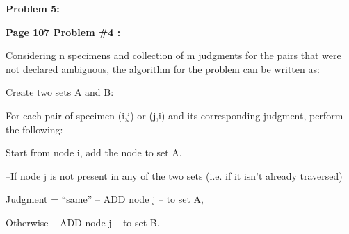 \documentclass[letterpaper,portrait,12pt]{article}
\begin{document}
\begin{flushleft}

\end{flushleft}


\begin{flushleft}

\end{flushleft}


\begin{flushleft}
\textbf{Problem 5:}
\end{flushleft}


\begin{flushleft}
\textbf{Page 107 Problem \#4 :}
\end{flushleft}


\begin{flushleft}
	Considering n specimens and collection of m judgments for the pairs that were not declared ambiguous, the algorithm for the problem can be written as:
\end{flushleft}


\begin{flushleft}

\end{flushleft}


\begin{flushleft}
Create two sets A and B:
\end{flushleft}


\begin{flushleft}
For each pair of specimen (i,j) or (j,i) and its corresponding judgment, perform the following:
\end{flushleft}


\begin{flushleft}
Start from node i, add the node to set A.
\end{flushleft}


\begin{flushleft}

\end{flushleft}


\begin{flushleft}
	--If node j is not present in any of the two sets (i.e. if it isn't already traversed)
\end{flushleft}


\begin{flushleft}
		Judgment = {``}same'' -- ADD node j -- to set A,
\end{flushleft}


\begin{flushleft}
		Otherwise -- ADD node j -- to set B.
\end{flushleft}
\end{document}
